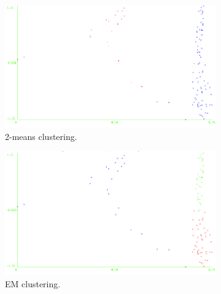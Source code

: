 \documentclass[11pt, letterpaper]{article}            %
\begin{document}
\begin{figure}[htbp]
  \centering
  \begin{subfigure}[b]{0.32\textwidth}
    \includegraphics[width=\textwidth]{./gfx/km25.png}
    \caption{2-means clustering.\label{fig:svstd:km}}
  \end{subfigure}
  \hfill
  \begin{subfigure}[b]{0.32\textwidth}
    \includegraphics[width=\textwidth]{./gfx/em25.png}
    \caption{EM clustering.\label{fig:svstd:em}}
  \end{subfigure}
  \hfill
  \begin{subfigure}[b]{0.32\textwidth}

\end{subfigure}
\end{figure}
\end{document}
